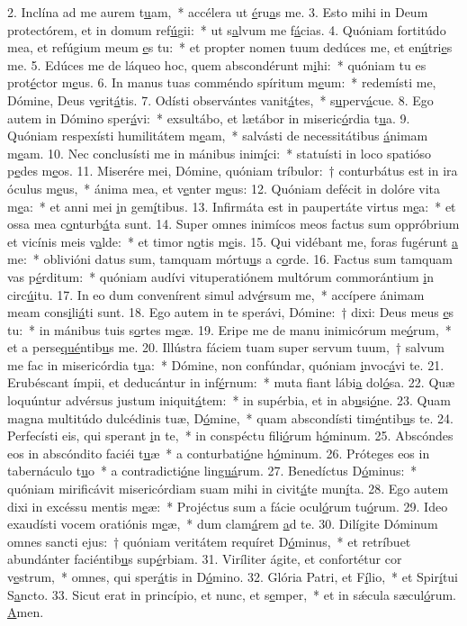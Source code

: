 2. Inclína ad me aurem t\uline{u}am,~* accélera ut \uline{é}ru\uline{a}s me.
3. Esto mihi in Deum protectórem, et in domum ref\uline{ú}gii:~* ut s\uline{a}lvum me f\uline{á}cias.
4. Quóniam fortitúdo mea, et refúgium meum \uline{e}s tu:~* et propter nomen tuum dedúces me, et en\uline{ú}tri\uline{e}s me.
5. Edúces me de láqueo hoc, quem abscondérunt m\uline{i}hi:~* quóniam tu es prot\uline{é}ctor m\uline{e}us.
6. In manus tuas comméndo spíritum m\uline{e}um:~* redemísti me, Dómine, Deus v\uline{e}rit\uline{á}tis.
7. Odísti observántes vanit\uline{á}tes,~* s\uline{u}perv\uline{á}cue.
8. Ego autem in Dómino sper\uline{á}vi:~* exsultábo, et lætábor in miseric\uline{ó}rdia t\uline{u}a.
9. Quóniam respexísti humilitátem m\uline{e}am,~* salvásti de necessitátibus \uline{á}nimam m\uline{e}am.
10. Nec conclusísti me in mánibus inim\uline{í}ci:~* statuísti in loco spatióso p\uline{e}des m\uline{e}os.
11. Miserére mei, Dómine, quóniam tríbulor:~† conturbátus est in ira óculus m\uline{e}us,~* ánima mea, et v\uline{e}nter m\uline{e}us:
12. Quóniam defécit in dolóre vita m\uline{e}a:~* et anni mei \uline{i}n gem\uline{í}tibus.
13. Infirmáta est in paupertáte virtus m\uline{e}a:~* et ossa mea c\uline{o}nturb\uline{á}ta sunt.
14. Super omnes inimícos meos factus sum oppróbrium et vicínis meis v\uline{a}lde:~* et timor n\uline{o}tis m\uline{e}is.
15. Qui vidébant me, foras fugérunt \uline{a} me:~* oblivióni datus sum, tamquam mórtu\uline{u}s a c\uline{o}rde.
16. Factus sum tamquam vas p\uline{é}rditum:~* quóniam audívi vituperatiónem multórum commorántium \uline{i}n circ\uline{ú}itu.
17. In eo dum convenírent simul adv\uline{é}rsum me,~* accípere ánimam meam cons\uline{i}li\uline{á}ti sunt.
18. Ego autem in te sperávi, Dómine:~† dixi: Deus meus \uline{e}s tu:~* in mánibus tuis s\uline{o}rtes m\uline{e}æ.
19. Eripe me de manu inimicórum me\uline{ó}rum,~* et a perse\uline{qué}ntib\uline{u}s me.
20. Illústra fáciem tuam super servum tuum,~† salvum me fac in misericórdia t\uline{u}a:~* Dómine, non confúndar, quóniam \uline{i}nvoc\uline{á}vi te.
21. Erubéscant ímpii, et deducántur in inf\uline{é}rnum:~* muta fiant lábi\uline{a} dol\uline{ó}sa.
22. Quæ loquúntur advérsus justum iniquit\uline{á}tem:~* in supérbia, et in ab\uline{u}si\uline{ó}ne.
23. Quam magna multitúdo dulcédinis tuæ, D\uline{ó}mine,~* quam abscondísti tim\uline{é}ntib\uline{u}s te.
24. Perfecísti eis, qui sperant \uline{i}n te,~* in conspéctu fili\uline{ó}rum h\uline{ó}minum.
25. Abscóndes eos in abscóndito faciéi t\uline{u}æ~* a conturbati\uline{ó}ne h\uline{ó}minum.
26. Próteges eos in tabernáculo t\uline{u}o~* a contradicti\uline{ó}ne lin\uline{guá}rum.
27. Benedíctus D\uline{ó}minus:~* quóniam mirificávit misericórdiam suam mihi in civit\uline{á}te mun\uline{í}ta.
28. Ego autem dixi in excéssu mentis m\uline{e}æ:~* Projéctus sum a fácie ocul\uline{ó}rum tu\uline{ó}rum.
29. Ideo exaudísti vocem oratiónis m\uline{e}æ,~* dum clam\uline{á}rem \uline{a}d te.
30. Dilígite Dóminum omnes sancti ejus:~† quóniam veritátem requíret D\uline{ó}minus,~* et retríbuet abundánter faciéntib\uline{u}s sup\uline{é}rbiam.
31. Viríliter ágite, et confortétur cor v\uline{e}strum,~* omnes, qui sper\uline{á}tis in D\uline{ó}mino.
32. Glória Patri, et F\uline{í}lio,~* et Spir\uline{í}tui S\uline{a}ncto.
33. Sicut erat in princípio, et nunc, et s\uline{e}mper,~* et in sǽcula sæcul\uline{ó}rum. \uline{A}men.

